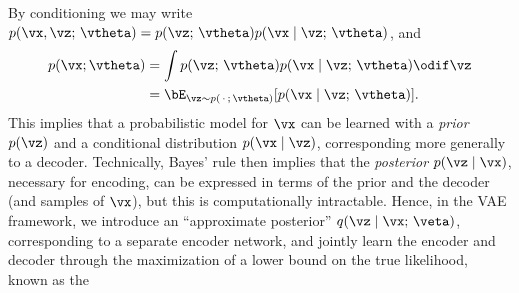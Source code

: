 \documentclass[../../book-main.tex]{subfiles}
\begin{document}
By conditioning we may write $p(\vx, \vz ;\, \vtheta)
= p(\vz;\, \vtheta) p(\vx \mid \vz;\, \vtheta)$, and
\begin{align*}
    p(\vx; \vtheta) &= \int p(\vz;\, \vtheta) p(\vx \mid \vz;\,
    \vtheta) \odif \vz
    \\
    &=
    \bE_{\vz \sim p(\,\cdot\,;\, \vtheta)}[ p(\vx \mid \vz;\, \vtheta) ].
\end{align*}
%
This implies that a probabilistic model for $\vx$ can be learned with
a \textit{prior} $p(\vz)$ and a conditional distribution $p(\vx \mid \vz)$,
corresponding more generally to a decoder.
Technically, Bayes' rule then implies that the \textit{posterior} $p(\vz \mid
\vx)$, necessary for encoding, can be expressed in terms of the prior and the
decoder (and samples of $\vx$), but this is computationally intractable. Hence,
in the VAE framework, we introduce an ``approximate posterior''
$q(\vz \mid \vx;\, \veta)$, corresponding
to a separate encoder network, and jointly learn the encoder and decoder through
the maximization of a lower bound on the true likelihood, known as the
\end{document}
